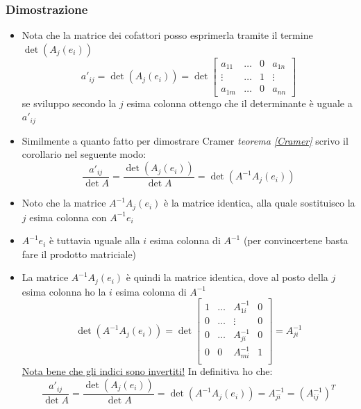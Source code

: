 \subsubsection*{Dimostrazione}
\begin{itemize}
	\item Nota che la matrice dei cofattori posso esprimerla tramite il termine $ \det \left( A_j \left( e_i \right)  \right)  $
	      \[
		      a'_{ij}= \det  \left( A_j \left( e_i \right)  \right) = \det
		      \begin{bmatrix}
			      a_{11}  & \ldots & 0 & a_{1n} \\
			      \vdots  & \ldots & 1 & \vdots \\
			      a_{1 m} & \ldots & 0 & a_{nn}
		      \end{bmatrix}
	      \]
	      se sviluppo secondo la $ j $ esima colonna ottengo che il determinante è uguale a $ a'_{ij} $
	\item Similmente a quanto fatto per dimostrare Cramer \textit{teorema  \ref{Cramer}} scrivo il corollario nel seguente modo:
	      \[
		      \frac{a'_{ij}}{\det A}=\frac{\det \left( A_j\left( e_i \right)  \right) }{\det A}=\det \left( A^{-1} A_j\left( e_i \right)  \right)
	      \]
	\item Noto che la matrice $ A^{-1}A_j\left( e_i \right)  $ è la matrice identica, alla quale sostituisco la $ j $ esima colonna con $ A^{-1}e_i $
	\item $ A^{-1}e_i $ è tuttavia uguale alla $ i $ esima colonna di $ A^{-1} $ (per convincertene basta fare il prodotto matriciale)
	\item La matrice $ A^{-1}A_j\left( e_i \right)  $ è quindi la matrice identica, dove al posto della $ j $ esima colonna ho la $ i $ esima colonna di $ A^{-1} $
	      \[
		      \det \left( A^{-1} A_j\left( e_i \right)  \right)= \det
		      \begin{bmatrix}
			      1 & \ldots & A^{-1}_{1i} & 0 \\
			      0 & \ldots & \vdots      & 0 \\
			      0 & \ldots & A^{-1}_{ji} & 0 \\
			      0 & 0      & A^{-1}_{mi} & 1 \\
		      \end{bmatrix}
		      = A^{-1}_{ji}
	      \]
	      \underline{Nota bene che gli indici sono invertiti!} In definitiva ho che:
	      \[
		      \frac{a'_{ij}}{\det A} = \frac{\det \left( A_j\left( e_i \right)  \right) }{\det A}=\det \left( A^{-1}A_j\left( e_i \right)  \right) = A^{-1}_{ji}=\left( A^{-1}_{ij} \right) ^{T}
	      \]
\end{itemize}

